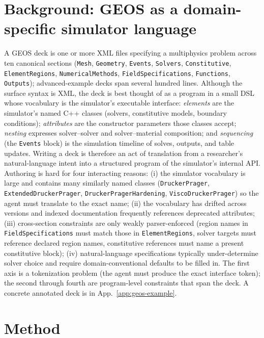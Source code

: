 \documentclass{article}
\begin{document}
\section{Background: GEOS as a domain-specific simulator language}
\label{sec:background}

A GEOS deck is one or more XML files specifying a multiphysics problem across ten canonical sections (\texttt{Mesh}, \texttt{Geometry}, \texttt{Events}, \texttt{Solvers}, \texttt{Constitutive}, \texttt{ElementRegions}, \texttt{NumericalMethods}, \texttt{FieldSpecifications}, \texttt{Functions}, \texttt{Outputs}); advanced-example decks span several hundred lines. Although the surface syntax is XML, the deck is best thought of as a program in a small DSL whose vocabulary is the simulator's executable interface: \emph{elements} are the simulator's named C++ classes (solvers, constitutive models, boundary conditions); \emph{attributes} are the constructor parameters those classes accept; \emph{nesting} expresses solver--solver and solver--material composition; and \emph{sequencing} (the \texttt{Events} block) is the simulation timeline of solves, outputs, and table updates. Writing a deck is therefore an act of translation from a researcher's natural-language intent into a structured program of the simulator's internal API. Authoring is hard for four interacting reasons: (i) the simulator vocabulary is large and contains many similarly named classes (\texttt{DruckerPrager}, \texttt{ExtendedDruckerPrager}, \texttt{DruckerPragerHardening}, \texttt{ViscoDruckerPrager}) so the agent must translate to the exact name; (ii) the vocabulary has drifted across versions and indexed documentation frequently references deprecated attributes; (iii) cross-section constraints are only weakly parser-enforced (region names in \texttt{FieldSpecifications} must match those in \texttt{ElementRegions}, solver targets must reference declared region names, constitutive references must name a present constitutive block); (iv) natural-language specifications typically under-determine solver choice and require domain-conventional defaults to be filled in. The first axis is a tokenization problem (the agent must produce the exact interface token); the second through fourth are program-level constraints that span the deck. A concrete annotated deck is in App.~\ref{app:geos-example}.


\section{Method}
\label{sec:method}
\end{document}
